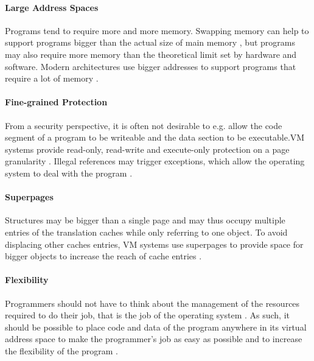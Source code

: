 
\paragraph{Large Address Spaces} Programs tend to require more and more memory. Swapping memory can help
to support programs bigger than the actual size of main memory \cite{tanenbaumOS}, but programs may
also require more memory than the theoretical limit set by hardware and software. Modern architectures
use bigger addresses to support programs that require a lot of memory
\cite{jacobSoftwaremanagedAddressTranslation1997, jacobVirtualMemoryContemporary1998}.


\paragraph{Fine-grained Protection} From a security perspective, it is often not desirable to e.g. allow the code segment
of a program to be writeable and the data section to be executable.VM systems provide read-only,
read-write and execute-only protection on a page granularity \cite{jacobSoftwaremanagedAddressTranslation1997}.
Illegal references may trigger exceptions, which allow the operating system to deal with the program \cite{jacobVirtualMemoryContemporary1998}.


\paragraph{Superpages}
Structures may be bigger than a single page and may thus occupy multiple entries of the translation caches while
only referring to one object. To avoid displacing other caches entries, VM systems use
superpages to provide space for bigger objects to increase the reach of cache entries \cite{jacobSoftwaremanagedAddressTranslation1997}.


\paragraph{Flexibility} Programmers should not have to think about the management
of the resources required to do their job, that is the job of the operating system \cite{tanenbaumOS}. As such, it should be possible to place code and data of the program anywhere in its virtual address space to make the programmer's
job as easy as possible and to increase the flexibility of the program
\cite{jacob1998virtualissues}. %

